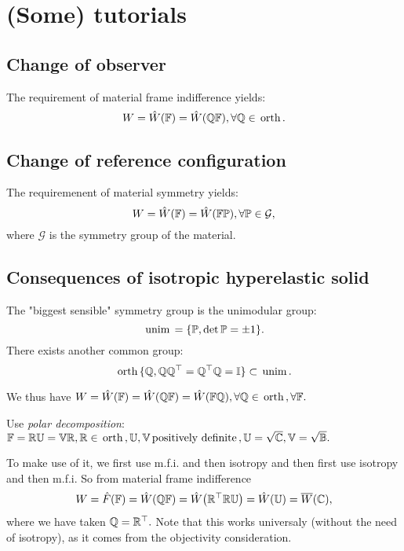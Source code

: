 \documentclass[reqno, a4paper]{article}
\begin{document}
\section{(Some) tutorials}
\label{sec:tutorials}

\subsection{Change of observer}
\label{sec:chobserver}

The requirement of material frame indifference yields:
\[
	W = \hat{W}\qty(\mathbb{F}) = \hat{W}\qty(\mathbb{Q}\mathbb{F}), \forall \mathbb{Q} \in \, \text{orth} \,.
\]

\subsection{Change of reference configuration}
\label{sec:chreference}
The requiremenent of material symmetry yields:
\[
	W= \hat{W}\qty(\mathbb{F})= \hat{W}\qty(\mathbb{F} \mathbb{P}), \forall \mathbb{P} \in \mathcal{G},
\]
where $\mathcal{G}$ is the symmetry group of the material.

\subsection{Consequences of isotropic hyperelastic solid}
\label{sec:conshypelisosolid}

\begin{remark}
	The "biggest sensible" symmetry group is the unimodular group:
	\[
		\, \text{unim} \, = \{\mathbb{P}, \det \mathbb{P} = \pm 1\}.
	\]
	There exists another common group:
	\[
		\, \text{orth} \, \{ \mathbb{Q}, \mathbb{Q}\mathbb{Q}^\top = \mathbb{Q}^\top \mathbb{Q} = \mathbb{I}\} \subset \, \text{unim} \,.
	\]
\end{remark}
We thus have $W = \hat{W}\qty(\mathbb{F}) = \hat{W}\qty(\mathbb{Q}\mathbb{F}) = \hat{W}\qty(\mathbb{F} \mathbb{Q}), \forall \mathbb{Q} \in \, \text{orth} \,, \forall \mathbb{F}.$

Use \textit{polar decomposition}: $\mathbb{F} = \mathbb{R}\mathbb{U} = \mathbb{V}\mathbb{R}, \mathbb{R} \in \, \text{orth} \,, \mathbb{U,V} \, \text{positively definite} \,, \mathbb{U} = \sqrt{\mathbb{C}}, \mathbb{V} = \sqrt{\mathbb{B}}.$ 

To make use of it, we first use m.f.i. and then isotropy and then first use isotropy and then m.f.i.
So from material frame indifference
\[
	W = \hat{F}\qty(\mathbb{F}) = \hat{W}\qty(\mathbb{Q}\mathbb{F}) = \hat{W}\qty(\mathbb{R}^\top \mathbb{R} \mathbb{U}) = \hat{W}\qty(\mathbb{U}) = \overline{W}\qty(\mathbb{C}),
\]
where we have taken $\mathbb{Q} = \mathbb{R}^\top.$ Note that this works universaly (without the need of isotropy), as it comes from the objectivity consideration.
\end{document}
